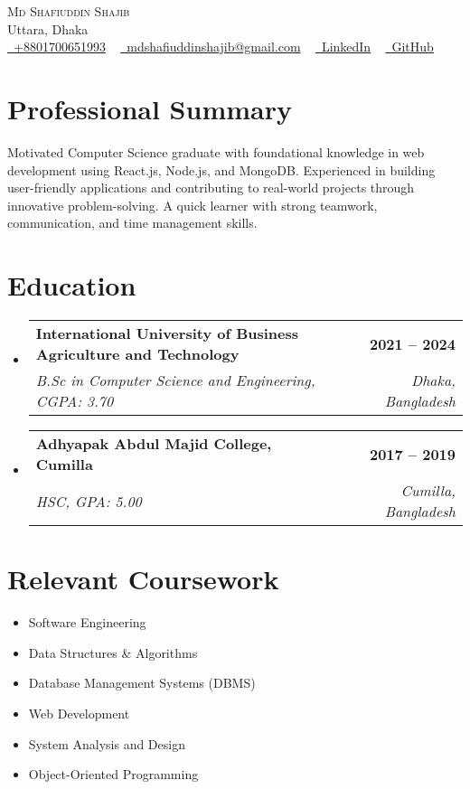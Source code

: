 \documentclass[letterpaper,11pt]{article}
\makeatletter
\newcommand{\resumeSubheading}[4]{
  \vspace{-2pt}\item
  \begin{tabular*}{\textwidth}{l@{\extracolsep{\fill}}r}
    \textbf{#1} & \textbf{#2} \\
    \textit{#3} & \textit{#4} \\
  \end{tabular*}\vspace{-5pt}
}
\newcommand{\resumeSubHeadingListStart}{\begin{itemize}[leftmargin=0in, label={}]}
\newcommand{\resumeSubHeadingListEnd}{\end{itemize}}
\makeatother
\begin{document}
\begin{center}
    {\Huge \scshape Md Shafiuddin Shajib} \\ \vspace{1pt}
    Uttara, Dhaka \\ \vspace{1pt}
    \small \href{tel:+8801700651993}{\faPhone~+8801700651993} ~ 
    \href{mailto:mdshafiuddinshajib@gmail.com}{\faEnvelope~mdshafiuddinshajib@gmail.com} ~ 
    \href{https://www.linkedin.com/in/mdshafiuddinshajib/}{\faLinkedin~LinkedIn} ~
    \href{https://github.com/md-shafiuddin-shajib}{\faGithub~GitHub}
\end{center}

\section{Professional Summary}
\small{
Motivated Computer Science graduate with foundational knowledge in web development using React.js, Node.js, and MongoDB. Experienced in building user-friendly applications and contributing to real-world projects through innovative problem-solving. A quick learner with strong teamwork, communication, and time management skills.
}

\section{Education}
  \resumeSubHeadingListStart
    \resumeSubheading
      {International University of Business Agriculture and Technology}{2021 -- 2024}
      {B.Sc in Computer Science and Engineering, CGPA: 3.70}{Dhaka, Bangladesh}
    \resumeSubheading
      {Adhyapak Abdul Majid College, Cumilla}{2017 -- 2019}
      {HSC, GPA: 5.00}{Cumilla, Bangladesh}
  \resumeSubHeadingListEnd

\section{Relevant Coursework}
\begin{multicols}{2}
\begin{itemize}[itemsep=0pt]
    \item Software Engineering
    \item Data Structures \& Algorithms
    \item Database Management Systems (DBMS)
    \item Web Development
    \item System Analysis and Design
    \item Object-Oriented Programming
\end{itemize}
\end{multicols}
\end{document}

